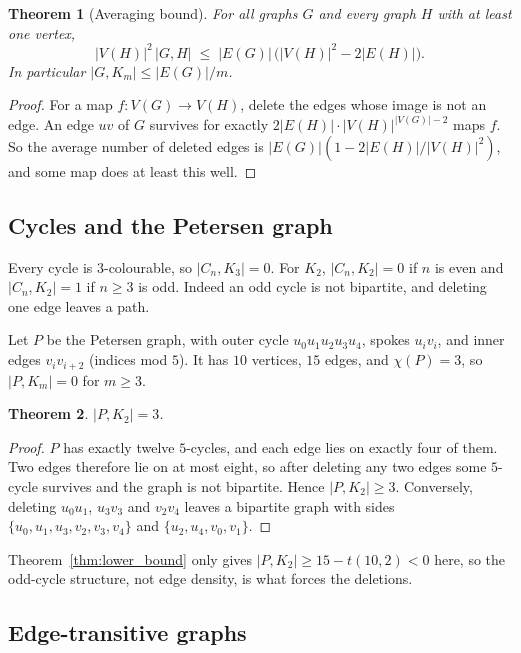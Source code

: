\documentclass{article}
\newtheorem{theorem}{Theorem}[section]
\theoremstyle{definition}
\begin{document}
\begin{theorem}[Averaging bound]
\label{thm:average}
For all graphs $G$ and every graph $H$ with at least one vertex,
\[
  |V(H)|^2\,|G,H|\;\le\;|E(G)|\,\bigl(|V(H)|^2-2|E(H)|\bigr).
\]
In particular $|G,K_m|\le|E(G)|/m$.
\end{theorem}

\begin{proof}
For a map $f\colon V(G)\to V(H)$, delete the edges whose image is not an edge.  An
edge $uv$ of $G$ survives for exactly $2|E(H)|\cdot|V(H)|^{|V(G)|-2}$ maps $f$.
So the average number of deleted edges is $|E(G)|(1-2|E(H)|/|V(H)|^2)$, and some
map does at least this well.
\end{proof}

\subsection{Cycles and the Petersen graph}

Every cycle is $3$-colourable, so $|C_n,K_3|=0$.  For $K_2$, $|C_n,K_2|=0$ if
$n$ is even and $|C_n,K_2|=1$ if $n\ge3$ is odd.  Indeed an odd cycle is not
bipartite, and deleting one edge leaves a path.

Let $P$ be the Petersen graph, with outer cycle $u_0u_1u_2u_3u_4$, spokes
$u_iv_i$, and inner edges $v_iv_{i+2}$ (indices mod $5$).  It has $10$ vertices,
$15$ edges, and $\chi(P)=3$, so $|P,K_m|=0$ for $m\ge3$.

\begin{theorem}
\label{thm:PK2}
$|P,K_2|=3$.
\end{theorem}

\begin{proof}
$P$ has exactly twelve $5$-cycles, and each edge lies on exactly four of them.
Two edges therefore lie on at most eight, so after deleting any two edges some
$5$-cycle survives and the graph is not bipartite.  Hence $|P,K_2|\ge3$.
Conversely, deleting $u_0u_1$, $u_3v_3$ and $v_2v_4$ leaves a bipartite graph
with sides $\{u_0,u_1,u_3,v_2,v_3,v_4\}$ and $\{u_2,u_4,v_0,v_1\}$.
\end{proof}

Theorem~\ref{thm:lower_bound} only gives $|P,K_2|\ge15-t(10,2)<0$ here, so the
odd-cycle structure, not edge density, is what forces the deletions.

\subsection{Edge-transitive graphs}
\end{document}
